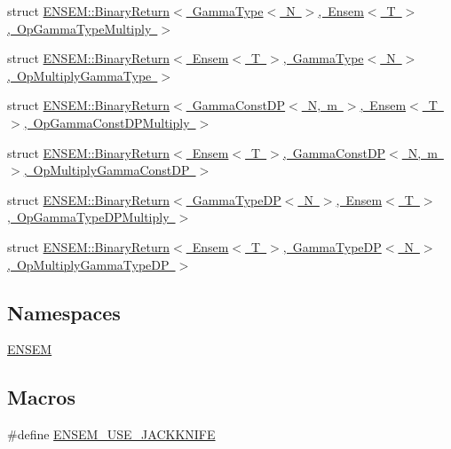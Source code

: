 \begin{DoxyCompactItemize}
\item 
struct \mbox{\hyperlink{structENSEM_1_1BinaryReturn_3_01GammaType_3_01N_01_4_00_01Ensem_3_01T_01_4_00_01OpGammaTypeMultiply_01_4}{E\+N\+S\+E\+M\+::\+Binary\+Return$<$ Gamma\+Type$<$ N $>$, Ensem$<$ T $>$, Op\+Gamma\+Type\+Multiply $>$}}
\item 
struct \mbox{\hyperlink{structENSEM_1_1BinaryReturn_3_01Ensem_3_01T_01_4_00_01GammaType_3_01N_01_4_00_01OpMultiplyGammaType_01_4}{E\+N\+S\+E\+M\+::\+Binary\+Return$<$ Ensem$<$ T $>$, Gamma\+Type$<$ N $>$, Op\+Multiply\+Gamma\+Type $>$}}
\item 
struct \mbox{\hyperlink{structENSEM_1_1BinaryReturn_3_01GammaConstDP_3_01N_00_01m_01_4_00_01Ensem_3_01T_01_4_00_01OpGammaConstDPMultiply_01_4}{E\+N\+S\+E\+M\+::\+Binary\+Return$<$ Gamma\+Const\+D\+P$<$ N, m $>$, Ensem$<$ T $>$, Op\+Gamma\+Const\+D\+P\+Multiply $>$}}
\item 
struct \mbox{\hyperlink{structENSEM_1_1BinaryReturn_3_01Ensem_3_01T_01_4_00_01GammaConstDP_3_01N_00_01m_01_4_00_01OpMultiplyGammaConstDP_01_4}{E\+N\+S\+E\+M\+::\+Binary\+Return$<$ Ensem$<$ T $>$, Gamma\+Const\+D\+P$<$ N, m $>$, Op\+Multiply\+Gamma\+Const\+D\+P $>$}}
\item 
struct \mbox{\hyperlink{structENSEM_1_1BinaryReturn_3_01GammaTypeDP_3_01N_01_4_00_01Ensem_3_01T_01_4_00_01OpGammaTypeDPMultiply_01_4}{E\+N\+S\+E\+M\+::\+Binary\+Return$<$ Gamma\+Type\+D\+P$<$ N $>$, Ensem$<$ T $>$, Op\+Gamma\+Type\+D\+P\+Multiply $>$}}
\item 
struct \mbox{\hyperlink{structENSEM_1_1BinaryReturn_3_01Ensem_3_01T_01_4_00_01GammaTypeDP_3_01N_01_4_00_01OpMultiplyGammaTypeDP_01_4}{E\+N\+S\+E\+M\+::\+Binary\+Return$<$ Ensem$<$ T $>$, Gamma\+Type\+D\+P$<$ N $>$, Op\+Multiply\+Gamma\+Type\+D\+P $>$}}
\end{DoxyCompactItemize}
\subsection*{Namespaces}
\begin{DoxyCompactItemize}
\item 
 \mbox{\hyperlink{namespaceENSEM}{E\+N\+S\+EM}}
\end{DoxyCompactItemize}
\subsection*{Macros}
\begin{DoxyCompactItemize}
\item 
\#define \mbox{\hyperlink{adat-devel_2lib_2ensem_2ensem__ensem_8h_a22c3867b3dd0f815cef41e7a46eadd11}{E\+N\+S\+E\+M\+\_\+\+U\+S\+E\+\_\+\+J\+A\+C\+K\+K\+N\+I\+FE}}
\end{DoxyCompactItemize}
